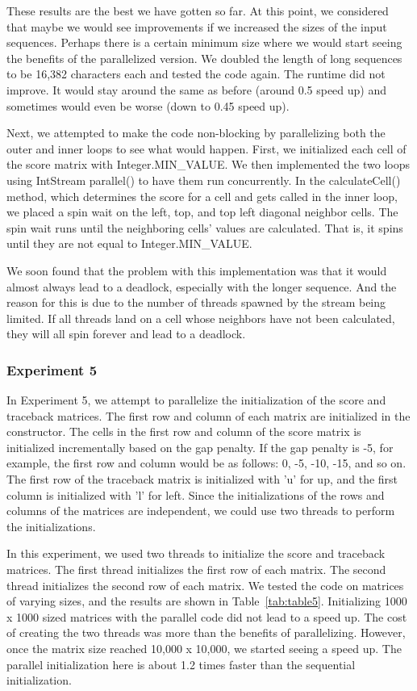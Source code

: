 \documentclass[conference]{IEEEtran}
\begin{document}
These results are the best we have gotten so far. At this point, we considered that maybe we would see improvements if we increased the sizes of the input sequences. Perhaps there is a certain minimum size where we would start seeing the benefits of the parallelized version. We doubled the length of long sequences to be 16,382 characters each and tested the code again. The runtime did not improve. It would stay around the same as before (around 0.5 speed up) and sometimes would even be worse (down to 0.45 speed up).

Next, we attempted to make the code non-blocking by parallelizing both the outer and inner loops to see what would happen. First, we initialized each cell of the score matrix with Integer.MIN\_VALUE. We then implemented the two loops using IntStream parallel() to have them run concurrently. In the calculateCell() method, which determines the score for a cell and gets called in the inner loop, we placed a spin wait on the left, top, and top left diagonal neighbor cells. The spin wait runs until the neighboring cells' values are calculated. That is, it spins until they are not equal to Integer.MIN\_VALUE.

We soon found that the problem with this implementation was that it would almost always lead to a deadlock, especially with the longer sequence. And the reason for this is due to the number of threads spawned by the stream being limited. If all threads land on a cell whose neighbors have not been calculated, they will all spin forever and lead to a deadlock.

\subsubsection{Experiment 5}
In Experiment 5, we attempt to parallelize the initialization of the score and traceback matrices. The first row and column of each matrix are initialized in the constructor. The cells in the first row and column of the score matrix is initialized incrementally based on the gap penalty. If the gap penalty is -5, for example, the first row and column would be as follows: 0, -5, -10, -15,  and so on. The first row of the traceback matrix is initialized with 'u' for up, and the first column is initialized with 'l' for left. Since the initializations of the rows and columns of the matrices are independent, we could use two threads to perform the initializations.

In this experiment, we used two threads to initialize the score and traceback matrices. The first thread initializes the first row of each matrix. The second thread initializes the second row of each matrix. We tested the code on matrices of varying sizes, and the results are shown in Table~\ref{tab:table5}. Initializing 1000 x 1000 sized matrices with the parallel code did not lead to a speed up. The cost of creating the two threads was more than the benefits of parallelizing. However, once the matrix size reached 10,000 x 10,000, we started seeing a speed up. The parallel initialization here is about 1.2 times  faster than the sequential initialization.
\end{document}
